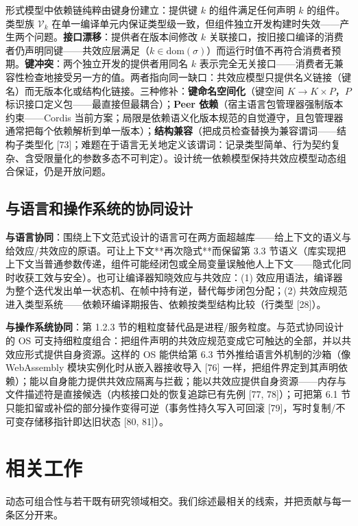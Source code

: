 \documentclass[11pt,a4paper]{article}
\theoremstyle{plain}
\theoremstyle{definition}
\theoremstyle{remark}
\begin{document}
形式模型中依赖链纯粹由键身份建立：提供键 $k$ 的组件满足任何声明 $k$ 的组件。类型族 $\mathcal{V}_k$ 在单一编译单元内保证类型级一致，但组件独立开发构建时失效——产生两个问题。\textbf{接口漂移}：提供者在版本间修改 $k$ 关联接口，按旧接口编译的消费者仍声明同键——共效应层满足（$k \in \mathrm{dom}(\sigma)$）而运行时值不再符合消费者预期。\textbf{键冲突}：两个独立开发的提供者用同名 $k$ 表示完全无关接口——消费者无兼容性检查地接受另一方的值。两者指向同一缺口：共效应模型只提供名义链接（键名）而无版本化或结构化链接。三种修补：\textbf{键命名空间化}（键空间 $K \to K \times P$，$P$ 标识接口定义包——最直接但最耦合）；\textbf{Peer 依赖}（宿主语言包管理器强制版本约束——Cordis 当前方案；局限是依赖语义化版本规范的自觉遵守，且包管理器通常把每个依赖解析到单一版本）；\textbf{结构兼容}（把成员检查替换为兼容谓词——结构子类型化 [73]；难题在于语言无关地定义该谓词：记录类型简单、行为契约复杂、含受限量化的参数多态不可判定）。设计统一依赖模型保持共效应模型动态组合保证，仍是开放问题。

\subsection{与语言和操作系统的协同设计}

\textbf{与语言协同}：围绕上下文范式设计的语言可在两方面超越库——给上下文的语义与给效应/共效应的原语。可让上下文**再次隐式**而保留第 3.3 节语义（库实现把上下文当普通参数传递，组件可能经闭包或全局变量误触他人上下文——隐式化同时收获工效与安全）。也可让编译器知晓效应与共效应：(1) 效应用语法，编译器为整个迭代发出单一状态机、在帧中持有逆，替代每步闭包分配；(2) 共效应规范进入类型系统——依赖环编译期报告、依赖按类型结构比较（行类型 [28]）。

\textbf{与操作系统协同}：第 1.2.3 节的粗粒度替代品是进程/服务粒度。与范式协同设计的 OS 可支持细粒度组合：把组件声明的共效应规范变成它可触达的全部，并以共效应形式提供自身资源。这样的 OS 能供给第 6.3 节外推给语言外机制的沙箱（像 WebAssembly 模块实例化时从嵌入器接收导入 [76] 一样，把组件界定到其声明依赖）；能以自身能力提供共效应隔离与拦截；能以共效应提供自身资源——内存与文件描述符是直接候选（内核接口处的恢复追踪已有先例 [77, 78]）；可把第 6.1 节只能扣留或补偿的部分操作变得可逆（事务性持久写入可回滚 [79]，写时复制/不可变存储移指针即达旧状态 [80, 81]）。
\section{相关工作}

动态可组合性与若干既有研究领域相交。我们综述最相关的线索，并把贡献与每一条区分开来。
\end{document}
